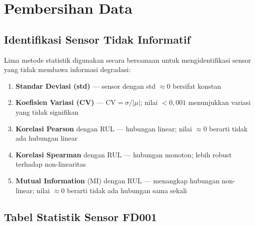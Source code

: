 \documentclass[11pt,a4paper]{article}
\begin{document}
\section{Pembersihan Data}

\subsection{Identifikasi Sensor Tidak Informatif}

Lima metode statistik digunakan secara bersamaan untuk mengidentifikasi sensor
yang tidak membawa informasi degradasi:

\begin{enumerate}[noitemsep]
  \item \textbf{Standar Deviasi (std)} --- sensor dengan std $\approx 0$ bersifat konstan
  \item \textbf{Koefisien Variasi (CV)} --- $\text{CV} = \sigma/|\mu|$;
    nilai $< 0{,}001$ menunjukkan variasi yang tidak signifikan
  \item \textbf{Korelasi Pearson} dengan RUL --- hubungan linear; nilai $\approx 0$
    berarti tidak ada hubungan linear
  \item \textbf{Korelasi Spearman} dengan RUL --- hubungan monoton; lebih robust
    terhadap non-linearitas
  \item \textbf{Mutual Information} (MI) dengan RUL --- menangkap hubungan
    non-linear; nilai $\approx 0$ berarti tidak ada hubungan sama sekali
\end{enumerate}

\subsection{Tabel Statistik Sensor FD001}
\end{document}

